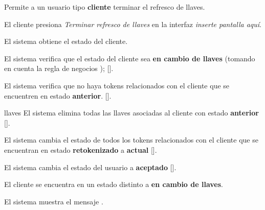 %
%

{
  Permite a un usuario tipo \textbf{cliente} terminar el refresco de llaves.

  \begin{trayectoriaPrincipal}

    \item El cliente presiona \textit{Terminar refresco de llaves} en la
      interfaz \textit{inserte pantalla aquí}.

    \item El sistema obtiene el estado del cliente.

    \item El sistema verifica que el estado del cliente sea
      \textbf{en cambio de llaves} (tomando en cuenta la regla de negocios
      );
      [].

    \item El sistema verifica que no haya tokens relacionados con el cliente
      que se encuentren en estado \textbf{anterior}.
      [].

    \item[llaves] El sistema elimina todas las llaves asociadas al cliente con
      estado \textbf{anterior} [].

    \item El sistema cambia el estado de todos los tokens relacionados con el
      cliente que se encuentran en estado \textbf{retokenizado} a
      \textbf{actual} [].

    \item El sistema cambia el estado del usuario a
      \textbf{aceptado} [].

  \end{trayectoriaPrincipal}

  \begin{trayectoriaAlternativa}
    {El cliente se encuentra en un estado distinto a
      \textbf{en cambio de llaves}.}

    \item El sistema muestra el mensaje
      .


\end{trayectoriaAlternativa}}
